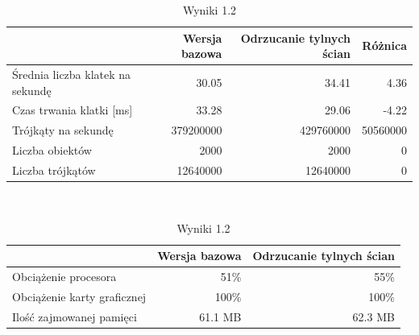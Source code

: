 \documentclass[a4paper,twoside,12pt]{book}
\begin{document}
\begin{table}[H]
    \centering
    \caption{Wyniki 1.2}
    \label{tab:backface_test2}
    \begin{tabular}{|l||r|r|r|}
        \hline
        & Wersja bazowa & Odrzucanie tylnych ścian & Różnica \\
        \hline
        Średnia liczba klatek na sekundę & 30.05 & 34.41 & 4.36 \\
        \hline
        Czas trwania klatki [ms] & 33.28 & 29.06 & -4.22 \\
        \hline
        Trójkąty na sekundę & 379200000 & 429760000 & 50560000 \\
        \hline
        Liczba obiektów & 2000 & 2000 & 0 \\
        \hline
        Liczba trójkątów & 12640000 & 12640000 & 0 \\
        \hline
    \end{tabular} \\
    
    \vspace*{0.5 cm}
    
    \begin{tabular}{|l||r|r|}
         \hline
        & Wersja bazowa & Odrzucanie tylnych ścian \\
         \hline
        Obciążenie procesora & 51\% & 55\% \\
        \hline
        Obciążenie karty graficznej & 100\% & 100\% \\
        \hline
        Ilość zajmowanej pamięci & 61.1 MB & 62.3 MB \\
        \hline
    \end{tabular}
\end{table}
\end{document}
